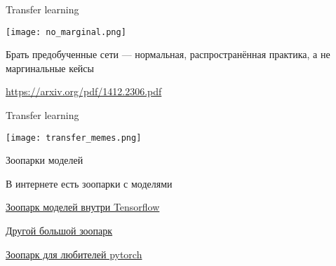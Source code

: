 \documentclass[notes,12pt, aspectratio=169]{beamer}
\newenvironment{wideitemize}{\itemize\addtolength{\itemsep}{10pt}}{\enditemize}
\begin{document}
\begin{frame}{Transfer learning}
\begin{center}
	\texttt{[image: no\_marginal.png]}
	
\alert{Брать предобученные сети — нормальная, распространённая практика, а не маргинальные кейсы}
\end{center}
\vfill %
\footnotesize
{\color{blue}  \url{https://arxiv.org/pdf/1412.2306.pdf}}
\end{frame}


\begin{frame}{Transfer learning}
\begin{center}
	\texttt{[image: transfer\_memes.png]}
\end{center}
\end{frame}


\begin{frame}{Зоопарки моделей}
\begin{wideitemize}
\item В интернете есть зоопарки с моделями
\item  {\color{blue} \href{https://tfhub.dev/}{Зоопарк моделей внутри Tensorflow} }
\item {\color{blue} \href{https://modelzoo.co/}{Другой большой зоопарк}}
\item  {\color{blue}  \href{https://github.com/pytorch/vision}{Зоопарк для любителей pytorch}}
\end{wideitemize}
\end{frame}
\end{document}
